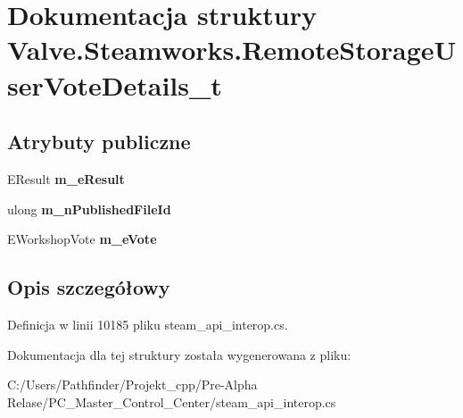 \hypertarget{struct_valve_1_1_steamworks_1_1_remote_storage_user_vote_details__t}{}\section{Dokumentacja struktury Valve.\+Steamworks.\+Remote\+Storage\+User\+Vote\+Details\+\_\+t}
\label{struct_valve_1_1_steamworks_1_1_remote_storage_user_vote_details__t}
\subsection*{Atrybuty publiczne}
\begin{DoxyCompactItemize}
\item 
\mbox{\label{struct_valve_1_1_steamworks_1_1_remote_storage_user_vote_details__t_aded5ded451f9b1c8fd76ea23b7223560}} 
E\+Result {\bfseries m\+\_\+e\+Result}
\item 
\mbox{\label{struct_valve_1_1_steamworks_1_1_remote_storage_user_vote_details__t_a242a1da18fe77c1ed70e9a0a491e975a}} 
ulong {\bfseries m\+\_\+n\+Published\+File\+Id}
\item 
\mbox{\label{struct_valve_1_1_steamworks_1_1_remote_storage_user_vote_details__t_aaaee056f161528e532c8bc236c808903}} 
E\+Workshop\+Vote {\bfseries m\+\_\+e\+Vote}
\end{DoxyCompactItemize}


\subsection{Opis szczegółowy}


Definicja w linii 10185 pliku steam\+\_\+api\+\_\+interop.\+cs.



Dokumentacja dla tej struktury została wygenerowana z pliku\+:\begin{DoxyCompactItemize}
\item 
C\+:/\+Users/\+Pathfinder/\+Projekt\+\_\+cpp/\+Pre-\/\+Alpha Relase/\+P\+C\+\_\+\+Master\+\_\+\+Control\+\_\+\+Center/steam\+\_\+api\+\_\+interop.\+cs\end{DoxyCompactItemize}
